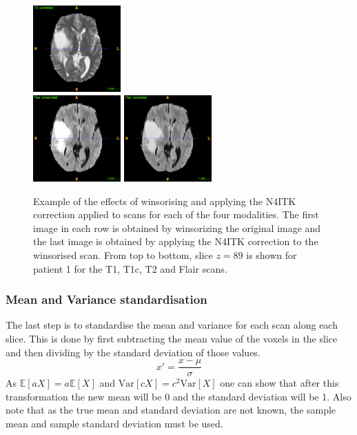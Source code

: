 \documentclass[12pt,a4paper,twoside,openright]{report}
\begin{document}
\begin{figure}
	\includegraphics[width=0.3\textwidth]{t2_n4itk_example} \\
	\vspace{0.5cm}
	\includegraphics[width=0.3\textwidth]{flair_winsorized_example}
	\includegraphics[width=0.3\textwidth]{flair_n4itk_example}
	\caption{Example of the effects of winsorising and applying the N4ITK correction applied to scans for each of the four modalities. The first image in each row is obtained by winsorizing the original image and the last image is obtained by applying the N4ITK correction to the winsorised scan. From top to bottom, slice $z=89$ is shown for patient 1 for the T1, T1c, T2 and Flair scans.}
	\label{fig:n4itk_example}
\end{figure}

\subsubsection{Mean and Variance standardisation}
The last step is to standardise the mean and variance for each scan along each slice. This is done by first subtracting the mean value of the voxels in the slice and then dividing by the standard deviation of those values. 
\begin{equation}
	x' = \frac{x - \mu}{\sigma}
\end{equation}
As $\mathbb{E}[aX] = a \mathbb{E}[X]$ and $\textrm{Var} [cX] = c^2 \textrm{Var} [X]$ one can show that after this transformation the new mean will be 0 and the standard deviation will be 1. Also note that as the true mean and standard deviation are not known, the sample mean and sample standard deviation must be used. 
\end{document}
